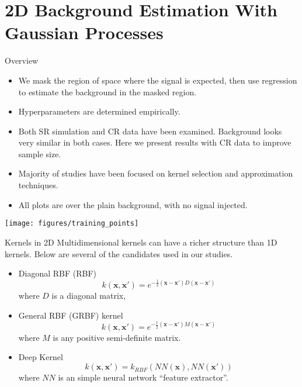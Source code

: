 \documentclass[10pt]{beamer}
\begin{document}
\section[Regression Results]{2D Background Estimation With Gaussian Processes}
\label{sec:2d-gauss-proc}

\begin{frame}{Overview}
  \begin{itemize}
  \item We mask the region of space where the signal is expected, then use regression to estimate the background in the masked region.
  \item Hyperparameters are determined empirically.
  \item Both SR simulation and CR data have been examined. Background looks very similar in both cases. Here we present results with CR data to improve sample size. 
  \item Majority of studies have been focused on kernel selection and approximation techniques.
  \item All plots are over the plain background, with no signal injected.
  \end{itemize}
  \begin{center}
    \texttt{[image: figures/training\_points]}
  \end{center}
\end{frame}

\begin{frame}{Kernels in 2D}
  Multidimensional kernels can have a richer structure than 1D kernels. Below are several of the candidates used in our studies.
  \begin{itemize}
  \item Diagonal RBF (RBF)
    \begin{equation}
      k(\bm{x},\bm{x'}) = e^{ -\frac{1}{2} \left(  \bm{x} - \bm{x'}\right) D \left(  \bm{x} - \bm{x'}\right)}
    \end{equation}
    where $D$ is a diagonal matrix,
  \item General RBF (GRBF) kernel
    \begin{equation}
      k(\bm{x},\bm{x'}) = e^{ -\frac{1}{2} \left(  \bm{x} - \bm{x'}\right) M \left(  \bm{x} - \bm{x'}\right)}
    \end{equation}
    where $M$ is any positive semi-definite matrix.
  \item Deep Kernel
    \begin{equation}
      k(\bm{x},\bm{x'}) =  k_{RBF}(NN(\bm{x}),NN(\bm{x'}))
    \end{equation}
    where $NN$ is an simple neural network ``feature extractor''.
  \end{itemize}
\end{frame}
\end{document}
